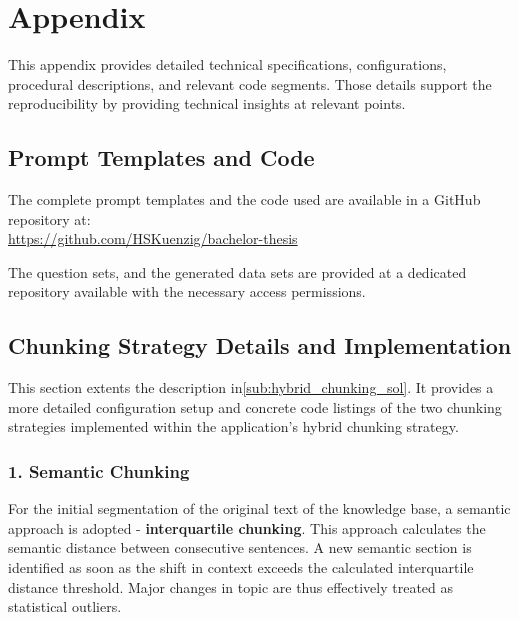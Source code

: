 \cleardoublepage
{}
{}
\chapter*{Appendix}\label{ch:appendix}

This appendix provides detailed technical specifications, configurations, procedural descriptions, and relevant code segments.
Those details support the reproducibility by providing technical insights at relevant points.

\section*{Prompt Templates and Code}\label{app:template_code}
The complete prompt templates and the code used are available in a GitHub repository at:\\

\url{https://github.com/HSKuenzig/bachelor-thesis}

The question sets, and the generated data sets are provided at a dedicated repository available with the necessary access permissions.
%
\section*{Chunking Strategy Details and Implementation}\label{app:chunking_strategies}

This section extents the description in\cref{sub:hybrid_chunking_sol}.
It provides a more detailed configuration setup and concrete code listings of the two chunking strategies implemented within the application's hybrid chunking strategy.

\subsection*{1. Semantic Chunking}
For the initial segmentation of the original text of the knowledge base, a semantic approach is adopted - \textbf{interquartile chunking}. 
This approach calculates the semantic distance between consecutive sentences.
A new semantic section is identified as soon as the shift in context exceeds the calculated interquartile distance threshold.
Major changes in topic are thus effectively treated as statistical outliers.

